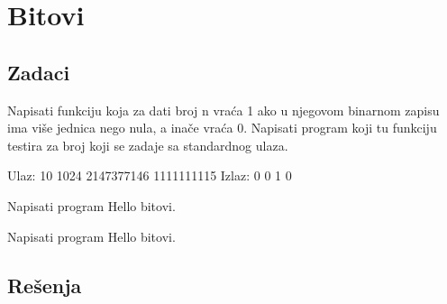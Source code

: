 
\chapter{Bitovi}

\section{Zadaci}



\begin{Exercise}[label=201]
Napisati funkciju  koja za dati broj n vraća 1 ako u njegovom binarnom zapisu ima više jednica nego nula, a inače vraća 0.  Napisati program koji tu funkciju testira za broj koji se zadaje sa standardnog ulaza.
\begin{test}
Ulaz:   10        1024       2147377146   1111111115
Izlaz:  0         0          1            0
\end{test}
\end{Exercise}
\begin{Answer}[ref=201]
\end{Answer}

\begin{Exercise}[label=202]
  Napisati program Hello bitovi.
\end{Exercise}
\begin{Answer}[ref=202]
\end{Answer}


\begin{Exercise}[label=203]
  Napisati program Hello bitovi.
\end{Exercise}
\begin{Answer}[ref=203]
\end{Answer}



\section{Rešenja}
\shipoutAnswer
